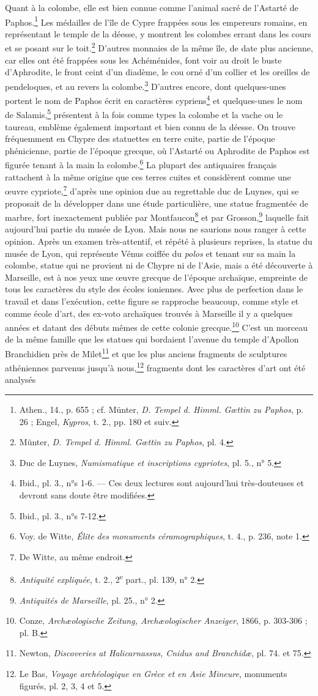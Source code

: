 \documentclass[a4paper, 11pt, oneside, landscape]{article}
\begin{document}
Quant à la colombe, elle est bien connue comme l'animal sacré de l'Astarté de Paphos.\footnote{Athen., 14., p. 655 ; cf. Münter, \emph{D. Tempel d. Himml. Gœttin zu Paphos}, p. 26 ; Engel, \emph{Kypros}, t. 2., pp. 180 et suiv.} Les médailles de l'île de Cypre frappées sous les empereurs romains, en représentant le temple de la déesse, y montrent les colombes errant dans les cours et se posant sur le toit.\footnote{Münter, \emph{D. Tempel d. Himml. Gœttin zu Paphos}, pl. 4.} D'autres monnaies de la même île, de date plus ancienne, car elles ont été frappées sous les Achéménides, font voir au droit le buste d'Aphrodite, le front ceint d'un diadème, le cou orné d'un collier et les oreilles de pendeloques, et au revers la colombe.\footnote{Duc de Luynes, \emph{Numismatique et inscriptions cypriotes}, pl. 5., n° 5.} D'autres encore, dont quelques-unes portent le nom de Paphos écrit en caractères cypriens\footnote{Ibid., pl. 3., n°s 1-6. --- Ces deux lectures sont aujourd'hui très-douteuses et devront sans doute être modifiées.} et quelques-unes le nom de Salamis,\footnote{Ibid., pl. 3., n°s 7-12.} présentent à la fois comme types la colombe et la vache ou le taureau, emblème également important et bien connu de la déesse. On trouve fréquemment en Chypre des statuettes en terre cuite, partie de l'époque phénicienne, partie de l'époque grecque, où l'Astarté ou Aphrodite de Paphos est figurée tenant à la main la colombe.\footnote{Voy. de Witte, \emph{Élite des monuments céramographiques}, t. 4., p. 236, note 1.} La plupart des antiquaires français rattachent à la même origine que ces terres cuites et considèrent comme une œuvre cypriote,\footnote{De Witte, au même endroit.} d'après une opinion due au regrettable duc de Luynes, qui se proposait de la développer dans une étude particulière, une statue fragmentée de marbre, fort inexactement publiée par Montfaucon\footnote{\emph{Antiquité expliquée}, t. 2., 2\textsuperscript{e} part., pl. 139, n° 2.} et par Grosson,\footnote{\emph{Antiquités de Marseille}, pl. 25., n° 2.} laquelle fait aujourd'hui partie du musée de Lyon. Mais nous ne saurions nous ranger à cette opinion. Après un examen très-attentif, et répété à plusieurs reprises, la statue du musée de Lyon, qui représente Vénus coiffée du \emph{polos} et tenant sur sa main la colombe, statue qui ne provient ni de Chypre ni de l'Asie, mais a été découverte à Marseille, est à nos yeux une œuvre grecque de l'époque archaïque, empreinte de tous les caractères du style des écoles ioniennes. Avec plus de perfection dans le travail et dans l'exécution, cette figure se rapproche beaucoup, comme style et comme école d'art, des ex-voto archaïques trouvés à Marseille il y a quelques années et datant des débuts mêmes de cette colonie grecque.\footnote{Conze, \emph{Archæologische Zeitung, Archæologischer Anzeiger}, 1866, p. 303-306 ; pl. B.} C'est un morceau de la même famille que les statues qui bordaient l'avenue du temple d'Apollon Branchidien près de Milet\footnote{Newton, \emph{Discoveries at Halicarnassus, Cnidus and Branchidæ}, pl. 74. et 75.} et que les plus anciens fragments de sculptures athéniennes parvenus jusqu'à nous,\footnote{Le Bas, \emph{Voyage archéologique en Grèce et en Asie Mineure}, monuments figurés, pl. 2, 3, 4 et 5.} fragments dont les caractères d'art ont été analysés 
\end{document}
